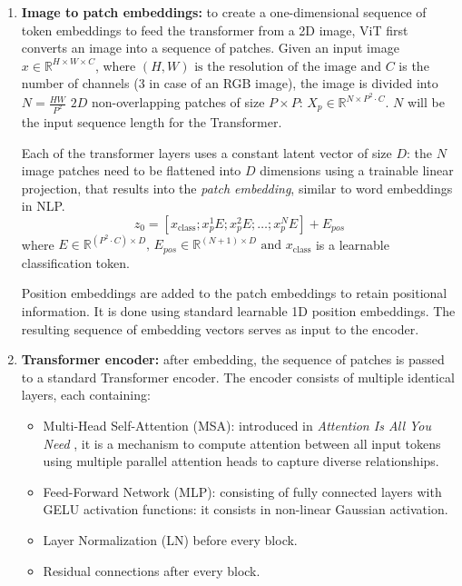\documentclass[ENG]{TFUOC}%
\begin{document}
\begin{enumerate}
    \item \textbf{Image to patch embeddings:} to create a one-dimensional sequence of token embeddings to feed the transformer from a 2D image, ViT first converts an image into a sequence of patches. Given an input image $x \in \mathbb{R}^{H \times W \times C}$, where $(H,W) \text{ is the resolution of the image and }C$ is the number of channels (3 in case of an RGB image), the image is divided into $N= \frac{HW}{P^2}$ $2D$ non-overlapping patches of size $P \times P$: $X_p \in \mathbb{R}^{N \times P^2 \cdot C}$. $N$ will be the input sequence length for the Transformer.

    Each of the transformer layers uses a constant latent vector of size $D$: the $N$ image patches need to be flattened into $D$ dimensions using a trainable linear projection, that results into the \textit{patch embedding}, similar to word embeddings in NLP.
    \[
    z_0 = [x_{\text{class}}; x_p^1E; x_p^2E; \dots; x_p^N E] + E_{pos}
    \]
    where $E \in \mathbb{R}^{(P^2 \cdot C) \times D}\text{, }E_{pos} \in \mathbb{R}^{(N+1) \times D} \text{ and } x_{\text{class}}$ is a learnable classification token.

    Position embeddings are added to the patch embeddings to retain positional information. It is done using standard learnable 1D position embeddings. The resulting sequence of embedding vectors serves as input to the encoder.
    \item \textbf{Transformer encoder:} after embedding, the sequence of patches is passed to a standard Transformer encoder. The encoder consists of multiple identical layers, each containing:
    
    \begin{itemize}
        \item Multi-Head Self-Attention (MSA): introduced in \textit{Attention Is All You Need} \cite{attention}, it is a mechanism to compute attention between all input tokens using multiple parallel attention heads to capture diverse relationships.
        \item Feed-Forward Network (MLP): consisting of fully connected layers with GELU activation functions\cite{gelu}: it consists in non-linear Gaussian activation.
        \item Layer Normalization (LN) before every block.
        \item Residual connections after every block.
    \end{itemize}
    
\end{enumerate}
\end{document}
